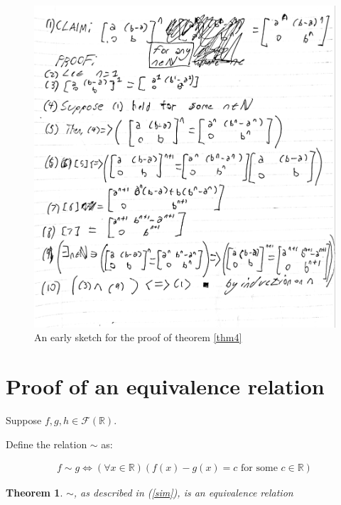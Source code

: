\documentclass[12pt]{amsart}
\newcommand{\reals}{\mathbb{R}}
\newcommand{\freals}{\mathcal{F}(\reals)}
\newtheorem{thm}{Theorem}
\begin{document}
\begin{figure}
	\includegraphics[scale=0.17]{proof12.jpg}
	\caption{An early sketch for the proof of theorem \ref{thm4}}
	\centering
	\label{proof12}
\end{figure}

\section{Proof of an equivalence relation}

Suppose $f,g,h \in \freals$.

Define the relation $\sim$ as:

\begin{align} \label{sim}
	f \sim g \iff (\forall x \in \reals)(f(x) - g(x) = c \text{ for some } c \in \reals)
\end{align}

\begin{thm} \label{thm5}
	$\sim$, as described in (\ref{sim}), is an equivalence relation
\end{thm}
\end{document}
